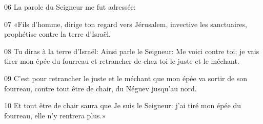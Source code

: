 
06 La parole du Seigneur me fut adressée:

07 «Fils d’homme, dirige ton regard vers Jérusalem, invective les sanctuaires, prophétise contre la terre d’Israël.

08 Tu diras à la terre d’Israël: Ainsi parle le Seigneur: Me voici contre toi; je vais tirer mon épée du fourreau et retrancher de chez toi le juste et le méchant.

09 C’est pour retrancher le juste et le méchant que mon épée va sortir de son fourreau, contre tout être de chair, du Néguev jusqu’au nord.

10 Et tout être de chair saura que Je suis le Seigneur: j’ai tiré mon épée du fourreau, elle n’y rentrera plus.»
